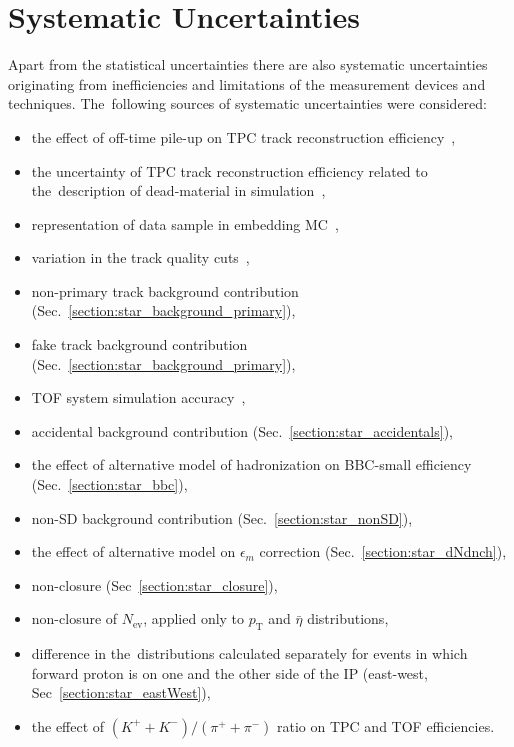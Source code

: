 \chapter{Systematic Uncertainties}\label{section:star_systematics}
Apart from the statistical uncertainties there are also systematic uncertainties originating from inefficiencies and limitations of the measurement devices and techniques. The~following sources of systematic uncertainties were considered:
\begin{itemize}
	\item the effect of off-time pile-up on TPC track reconstruction efficiency~\cite{supplementaryNote},
	\item the uncertainty of TPC track reconstruction efficiency related to the~description of dead-material in simulation~\cite{supplementaryNote},
	\item representation of data sample in embedding MC~\cite{supplementaryNote},
	\item variation in the track quality cuts~\cite{supplementaryNote},
	\item non-primary track background contribution (Sec.~\ref{section:star_background_primary}),
	\item fake track background contribution (Sec.~\ref{section:star_background_primary}),
	\item TOF system simulation accuracy~\cite{supplementaryNote},
	\item accidental background contribution (Sec.~\ref{section:star_accidentals}),
	\item the effect of alternative model of hadronization on BBC-small efficiency (Sec.~\ref{section:star_bbc}),
	\item non-SD background contribution (Sec.~\ref{section:star_nonSD}),
	\item the effect of alternative model  on $\epsilon_{ m}$ correction (Sec.~\ref{section:star_dNdnch}),
	\item non-closure (Sec~\ref{section:star_closure}),
	\item non-closure of $N_\textrm{ev}$, applied only to $p_\textrm{T}$ and $\bar{\eta}$ distributions,
	\item difference in the~distributions calculated separately for events in which forward proton is on one and the other side of the IP (east-west, Sec~\ref{section:star_eastWest}),
	\item the effect of $\left(K^{+}+K^{-}\right)/\left(\pi^{+}+\pi^{-}\right)$ ratio on TPC and TOF efficiencies.
\end{itemize}


